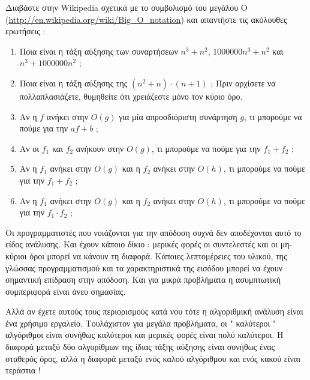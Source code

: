 \documentclass[10pt]{book}
\begin{document}
\begin{exercise}

Διαβάστε στην  Wikipedia  σχετικά με το συμβολισμό του μεγάλου Ο  
(\url{http://en.wikipedia.org/wiki/Big_O_notation})  και απαντήστε τις ακόλουθες 
ερωτήσεις : 

\begin{enumerate}
\item Ποια είναι η τάξη αύξησης των συναρτήσεων $n^3 + n^2$, $1000000 n^3 + n^2$ και $n^3 + 1000000 n^2$ ; 

\item Ποια είναι η τάξη αύξησης της $(n^2 + n) \cdot (n + 1)$ ;   Πριν  αρχίσετε να πολλαπλασιάζετε, θυμηθείτε ότι χρειάζεστε μόνο τον κύριο όρο.

\item Αν η $f$ ανήκει στην $O(g)$ για μία απροσδιόριστη συνάρτηση $g$, τι μπορούμε 
να πούμε για την $af+b$ ; 

\item Αν οι $f_1$ και $f_2$ ανήκουν στην $O(g)$, τι μπορούμε να πούμε για την 
$f_1 + f_2$ ; 

\item Αν η $f_1$ ανήκει στην $O(g)$ και η $f_2$ ανήκει στην $O(h)$, τι μπορούμε να πούμε για την $f_1 + f_2$ ; 

\item Αν η $f_1$ ανήκει στην $O(g)$ και η $f_2$ ανήκει στην $O(h)$, τι μπορούμε να 
πούμε για την $f_1 \cdot f_2$ ; 
\end{enumerate}

\end{exercise}

Οι προγραμματιστές που νοιάζονται για την απόδοση συχνά δεν αποδέχονται αυτό το είδος ανάλυσης.  Και έχουν κάποιο δίκιο :  μερικές φορές οι συντελεστές και οι μη-κύριοι όροι μπορεί να κάνουν τη διαφορά.  Κάποιες λεπτομέρειες του υλικού, της γλώσσας προγραμματισμού και τα χαρακτηριστικά της εισόδου μπορεί να έχουν σημαντική επίδραση στην απόδοση.  Και για μικρά προβλήματα η ασυμπτωτική συμπεριφορά είναι άνευ σημασίας.

Αλλά αν έχετε αυτούς τους περιορισμούς κατά νου τότε η αλγοριθμική ανάλυση είναι 
ένα χρήσιμο εργαλείο.  Τουλάχιστον για μεγάλα προβλήματα, οι  " καλύτεροι "  αλγόριθμοι είναι συνήθως καλύτεροι και μερικές φορές είναι πολύ καλύτεροι.  
Η διαφορά μεταξύ δύο αλγορίθμων της ίδιας τάξης αύξησης είναι συνήθως ένας σταθερός όρος, αλλά η διαφορά μεταξύ ενός καλού αλγόριθμου και ενός κακού είναι τεράστια ! 
\end{document}
